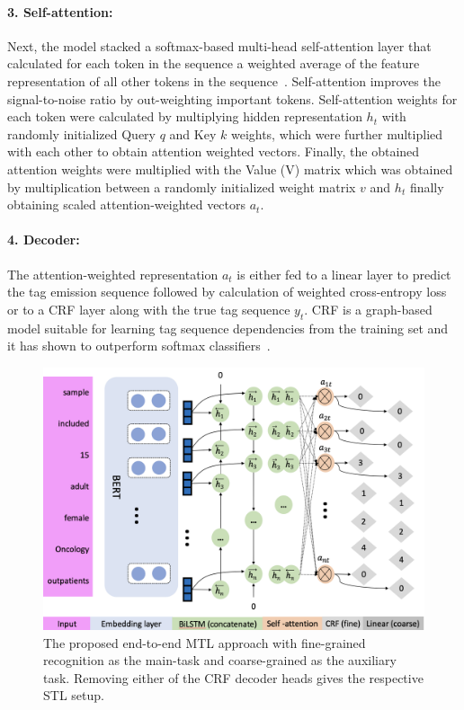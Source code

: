\documentclass[runningheads]{llncs}
\begin{document}
\paragraph{3. Self-attention: }
%
Next, the model stacked a softmax-based multi-head self-attention layer that calculated for each token in the sequence a weighted average of the feature representation of all other tokens in the sequence~\cite{vaswani2017attention}.
Self-attention improves the signal-to-noise ratio by out-weighting important tokens.
Self-attention weights for each token were calculated by multiplying hidden representation $h_{t}$ with randomly initialized Query $q$ and Key $k$ weights, which were further multiplied with each other to obtain attention weighted vectors.
Finally, the obtained attention weights were multiplied with the Value (V) matrix which was obtained by multiplication between a randomly initialized weight matrix $v$ and $h_{t}$ finally obtaining scaled attention-weighted vectors $a_{t}$.
%
\paragraph{4. Decoder:}
%
The attention-weighted representation $a_{t}$ is either fed to a linear layer to predict the tag emission sequence followed by calculation of weighted cross-entropy loss or to a CRF layer along with the true tag sequence $y_{t}$.
CRF is a graph-based model suitable for learning tag sequence dependencies from the training set and it has shown to outperform softmax classifiers~\cite{huang2015bidirectional}.
%
\begin{figure}
    \centering
    \includegraphics[scale=0.34]{figures/CLEF2021.png}
    \caption{The proposed end-to-end MTL approach with fine-grained recognition as the main-task and coarse-grained as the auxiliary task. Removing either of the CRF decoder heads gives the respective STL setup.}
    \label{fig:mtlsetup}
\end{figure}
%
%
\end{document}
